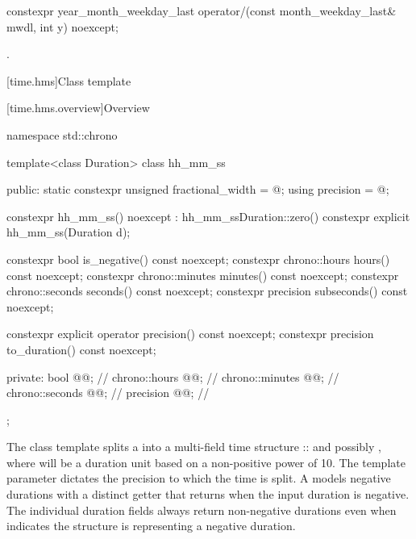 \begin{itemdecl}
constexpr year_month_weekday_last
  operator/(const month_weekday_last& mwdl, int y) noexcept;
\end{itemdecl}

\begin{itemdescr}
\pnum
\returns
{}.
\end{itemdescr}


[time.hms]{Class template }

[time.hms.overview]{Overview}

\begin{codeblock}
namespace std::chrono {
  template<class Duration> class hh_mm_ss {
  public:
    static constexpr unsigned fractional_width = @\seebelow@;
    using precision                            = @\seebelow@;

    constexpr hh_mm_ss() noexcept : hh_mm_ss{Duration::zero()} {}
    constexpr explicit hh_mm_ss(Duration d);

    constexpr bool is_negative() const noexcept;
    constexpr chrono::hours hours() const noexcept;
    constexpr chrono::minutes minutes() const noexcept;
    constexpr chrono::seconds seconds() const noexcept;
    constexpr precision subseconds() const noexcept;

    constexpr explicit operator precision() const noexcept;
    constexpr precision to_duration() const noexcept;

  private:
    bool            @@;     // \expos
    chrono::hours   @@;         // \expos
    chrono::minutes @@;         // \expos
    chrono::seconds @@;         // \expos
    precision       @@;        // \expos
  };
}
\end{codeblock}

\pnum
The  class template
splits a 
into a multi-field time structure
:: and
possibly ,
where  will be a duration unit
based on a non-positive power of 10.
The  template parameter dictates the precision
to which the time is split.
A  models negative durations
with a distinct  getter
that returns  when the input duration is negative.
The individual duration fields always return non-negative durations
even when  indicates
the structure is representing a negative duration.

